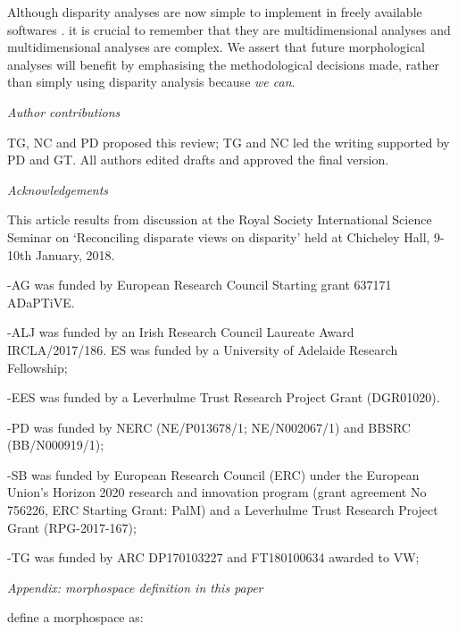 \documentclass[12pt,letterpaper]{article}
\renewcommand{\subsection}[1]{%
\bigskip
\begin{center}
\begin{large}
\normalfont\itshape #1
\end{large}
\end{center}}
\begin{document}
Although disparity analyses are now simple to implement in freely available softwares \citep{Navarro2003-vz, Bouxin2005-wk, oksanen2007vegan, Harmon2008-gq, lloyd2016, Guillerme2018-uc}.
it is crucial to remember that they are multidimensional analyses and multidimensional analyses are complex.
We assert that future morphological analyses will benefit by emphasising the methodological decisions made, rather than simply using disparity analysis because \textit{we can}.

\subsection{Author contributions}

TG, NC and PD proposed this review; TG and NC led the writing supported by PD and GT. All authors edited drafts and approved the final version.

\subsection{Acknowledgements}

This article results from discussion at the Royal Society International Science Seminar on `Reconciling disparate views on disparity' held at Chicheley Hall, 9-10th January, 2018.

-AG was funded by European Research Council Starting grant 637171 ADaPTiVE.

-ALJ was funded by an Irish Research Council Laureate Award IRCLA/2017/186. ES was funded by a University of Adelaide Research Fellowship;

-EES was funded by a Leverhulme Trust Research Project Grant (DGR01020).

-PD was funded by NERC (NE/P013678/1; NE/N002067/1) and BBSRC (BB/N000919/1);

-SB was funded by European Research Council (ERC) under the European Union's Horizon 2020 research and innovation program (grant agreement No 756226, ERC Starting Grant: PalM) and a Leverhulme Trust Research Project Grant (RPG-2017-167);

-TG was funded by ARC DP170103227 and FT180100634 awarded to VW;


\subsection{Appendix: morphospace definition in this paper}
\label{section:appendixmorphospace}

\noindent \cite{mitteroecker2009concept} define a morphospace as:
\end{document}
